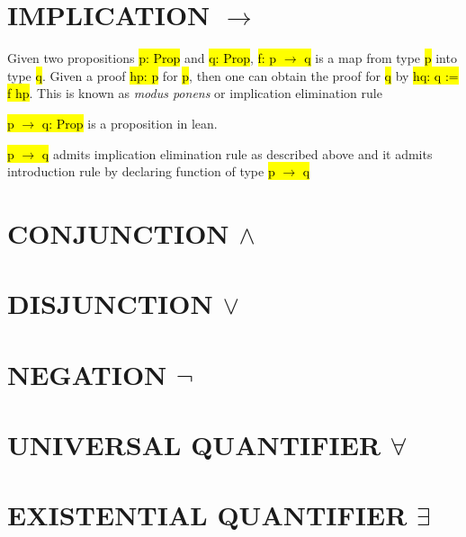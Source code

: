 \section{IMPLICATION $\to$}

Given two propositions \hl{p: Prop} and \hl{q: Prop}, \hl{f: p $\to$ q} is a map from type \hl{p} into type \hl{q}. Given a proof \hl{hp: p} for \hl{p}, then one can obtain the proof for \hl{q} by \hl{hq: q := f hp}. This is known as \textit{modus ponens} or implication elimination rule

\hl{p $\to$ q: Prop} is a proposition in lean.

\hl{p $\to$ q} admits implication elimination rule as described above and it admits introduction rule by declaring function of type \hl{p $\to$ q}

\section{CONJUNCTION $\land$}

\section{DISJUNCTION $\lor$}

\section{NEGATION $\lnot$}

\section{UNIVERSAL QUANTIFIER $\forall$}

\section{EXISTENTIAL QUANTIFIER $\exists$}


